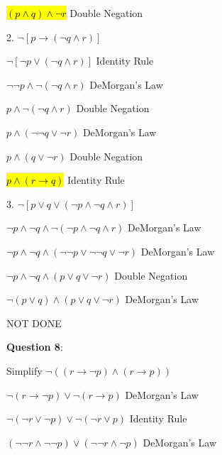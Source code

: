 \documentclass{article} %
\newcommand{\question}[2][]{\begin{flushleft}
        \textbf{Question #1}: \textit{#2}

\end{flushleft}}
\begin{document}
        \tabto{0.98cm}\hl{$(p \land q) \land \neg r$} \tabto*{3.7cm} Double Negation

        \hspace{0cm}

        2. $\neg[p \rightarrow (\neg q \land r)]$

        \tabto{0.98cm}$\neg[\neg p \lor (\neg q \land r)]$ \tabto*{3.7cm} Identity Rule

        \tabto{0.98cm}$\neg \neg p \land \neg (\neg q \land r)$ \tabto*{3.7cm} DeMorgan's Law

        \tabto{0.98cm}$p \land \neg (\neg q \land r)$ \tabto*{3.7cm} Double Negation

        \tabto{0.98cm}$p \land (\neg \neg q \lor \neg r)$ \tabto*{3.7cm} DeMorgan's Law

        \tabto{0.98cm}$p \land (q \lor \neg r)$ \tabto*{3.7cm} Double Negation

        \tabto{0.98cm}\hl{$p \land (r \rightarrow q)$} \tabto*{3.7cm} Identity Rule

        \hspace{0cm}

        3. $\neg[p \lor q \lor (\neg p \land \neg q \land r)]$

        \tabto{0.98cm}$\neg p \land \neg q \land \neg (\neg p \land \neg q \land r)$ \tabto*{5.4cm} DeMorgan's Law

        \tabto{0.98cm}$\neg p \land \neg q \land (\neg \neg p \lor \neg \neg q \lor \neg r)$ \tabto*{5.4cm} DeMorgan's Law

        \tabto{0.98cm}$\neg p \land \neg q \land (p \lor q \lor \neg r)$ \tabto*{5.4cm} Double Negation

        \tabto{0.98cm}$\neg (p \lor q) \land (p \lor q \lor \neg r)$ \tabto*{5.4cm} DeMorgan's Law

        \tabto{0.98cm} NOT DONE

    \question[8]{}

        Simplify $\neg ((r \rightarrow \neg p) \land (r \rightarrow p))$

        \hspace*{0.05cm}

        $\neg(r \rightarrow \neg p) \lor \neg(r \rightarrow p) $ \tabto*{5cm} DeMorgan's Law

        $\neg(\neg r \lor \neg p) \lor \neg( \neg r \lor p) $ \tabto*{5cm} Identity Rule

        $(\neg \neg r \land \neg \neg p) \lor (\neg \neg r \land \neg p) $ \tabto*{5cm} DeMorgan's Law
\end{document}
